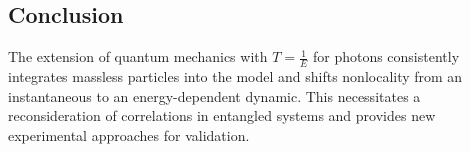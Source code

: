 \documentclass[a4paper,12pt]{article}
\begin{document}
	\subsection{Conclusion}
	The extension of quantum mechanics with \( T = \frac{1}{E} \) for photons consistently integrates massless particles into the model and shifts nonlocality from an instantaneous to an energy-dependent dynamic. This necessitates a reconsideration of correlations in entangled systems and provides new experimental approaches for validation.
	
\end{document}
